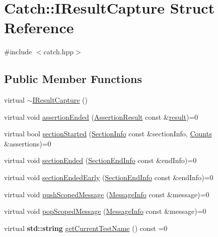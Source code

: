 \hypertarget{struct_catch_1_1_i_result_capture}{}\section{Catch\+:\+:I\+Result\+Capture Struct Reference}
\label{struct_catch_1_1_i_result_capture}


{\ttfamily \#include $<$catch.\+hpp$>$}

\subsection*{Public Member Functions}
\begin{DoxyCompactItemize}
\item 
virtual \hyperlink{struct_catch_1_1_i_result_capture_a3bd16719d6772b7470887fc36c6d0808}{$\sim$\+I\+Result\+Capture} ()
\item 
virtual void \hyperlink{struct_catch_1_1_i_result_capture_ae45e08bccc5fb434656d4f2e44742223}{assertion\+Ended} (\hyperlink{class_catch_1_1_assertion_result}{Assertion\+Result} const \&\hyperlink{util_8cpp_ade6d6d18a46c8aa95eed5e179d003e45}{result})=0
\item 
virtual bool \hyperlink{struct_catch_1_1_i_result_capture_a5b76ed52badcb64cf374202e12b81a03}{section\+Started} (\hyperlink{struct_catch_1_1_section_info}{Section\+Info} const \&section\+Info, \hyperlink{struct_catch_1_1_counts}{Counts} \&assertions)=0
\item 
virtual void \hyperlink{struct_catch_1_1_i_result_capture_a4e152bc43dc0933684e31fa67a58195d}{section\+Ended} (\hyperlink{struct_catch_1_1_section_end_info}{Section\+End\+Info} const \&end\+Info)=0
\item 
virtual void \hyperlink{struct_catch_1_1_i_result_capture_afcc71eef8ca821ae132cced4a2be6988}{section\+Ended\+Early} (\hyperlink{struct_catch_1_1_section_end_info}{Section\+End\+Info} const \&end\+Info)=0
\item 
virtual void \hyperlink{struct_catch_1_1_i_result_capture_a91d154c1e087e383dcde5aad95cb6a05}{push\+Scoped\+Message} (\hyperlink{struct_catch_1_1_message_info}{Message\+Info} const \&message)=0
\item 
virtual void \hyperlink{struct_catch_1_1_i_result_capture_a42bcb13276706bf8c3ce081ce16d37fd}{pop\+Scoped\+Message} (\hyperlink{struct_catch_1_1_message_info}{Message\+Info} const \&message)=0
\item 
virtual \textbf{ std\+::string} \hyperlink{struct_catch_1_1_i_result_capture_aea1617f4a84cc648246aa3ed6918b5bf}{get\+Current\+Test\+Name} () const =0

\end{DoxyCompactItemize}
